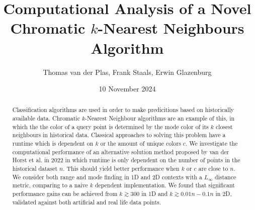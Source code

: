 \documentclass{article}
\title{Computational Analysis of a Novel Chromatic $k$-Nearest Neighbours Algorithm}
\author{Thomas van der Plas, Frank Staals, Erwin Glazenburg}
\date{10 November 2024}
\newcommand{\fb}[1]{{#1}}
\begin{document}
\maketitle

\begin{abstract}
    \fb{Classification algorithms are used in order to make predicitions based on historically available data. Chromatic $k$-Nearest Neighbour algorithms are an example of this, in which the} the color of a query point is determined by the mode color of its $k$ closest neighbours \fb{in historical data}. Classical approaches to solving this problem have a runtime which is dependent on $k$ or the amount of unique colors $c$. \fb{We investigate the computational performance of an alternative solution method proposed by van der Horst et al. in 2022 in which runtime is only dependent on the number of points in the historical dataset $n$. This should yield better performance when $k$ or $c$ are close to $n$.}\\
    We consider both range and mode finding in 1D and 2D contexts with a $L_\infty$ distance metric, comparing to a naive $k$ dependent implementation. We found that significant performance gains can be achieved from $k \gtrsim 300$ in 1D and $k \gtrsim 0.01n-0.1n$ in 2D, validated against both artificial and real life data points.
\end{abstract}
\end{document}
